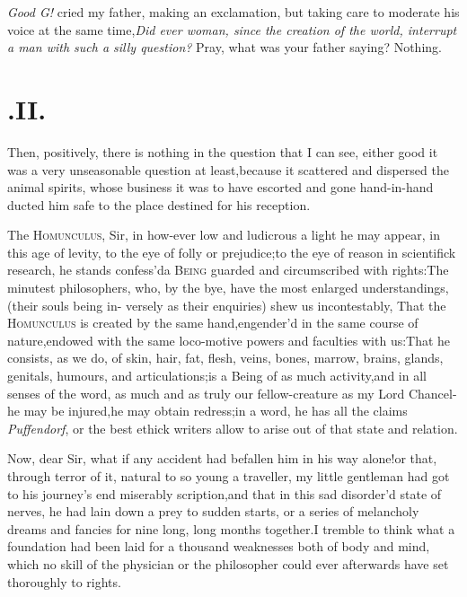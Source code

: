\documentclass{article}
\begin{document}
\noindent
{}
\textit{Good G\tsk!} cried my father, making
an exclamation, but taking care to moderate his voice at the same
time,\tsh \textit{Did ever woman, since the creation of the
world, interrupt a man with such a silly question?} Pray, what
was your father saying?\tsh\break 
Nothing.

\section{.\enspace II.}

\quad \tsk Then, positively, there is nothing in the question that I can see, either good
it was a very unseasonable question at
least,\tsk  because it scattered and dispersed the animal spirits, whose business it
was to have escorted and gone hand-in-hand 
ducted him safe to the place destined for his reception.

The \textsc{Homunculus}, Sir, in how-ever low and ludicrous a light he may appear,
in this age of levity, to the eye of folly or prejudice;\tsk  to the eye of reason
in scientifick research, he stands confess’d\tsk\break a \textsc{Being} guarded and
circumscribed with rights:\tsh  The minutest philosophers, 
who, by the bye, have the most enlarged understandings, (their souls being in-\break 
versely as their enquiries) shew us incontestably, That the \textsc{Homunculus} is
created by the same hand,\tsk engender’d in the same course of nature,\tsk  endowed
with the same loco-motive powers and faculties with us:\tsk  That he consists,\break
as we do, of skin, hair, fat, flesh, veins,\break
{}\break
bones, marrow, brains, glands, genitals, humours, and articulations;\tsk  is a Being
of as much activity,\tsk  and in all senses of the word, as much and as truly our
fellow-creature as my Lord Chancel-\break
{}
he may be injured,\tsk  he may obtain redress;\tsk in a word, he has all the claims
\textit{Puffendorf}, or the best ethick writers allow to arise out of that state and relation.

Now, dear Sir, what if any accident had befallen him in his way
alone!\tsk\break  or that, through terror of it, natural to so young a
traveller, my little gentleman had got to his journey’s end
miserably 
scription,\tsk  and that in this sad disorder’d state of
nerves, he had lain down a prey to sudden starts, or a series of
melancholy dreams and fancies for nine long, long months
together.\tsh  I tremble to think what a foundation had been laid
for a thousand weaknesses both of body and mind, which no skill of
the physician or the philosopher could ever afterwards have set
thoroughly to rights.\hfill
{}
\end{document}
